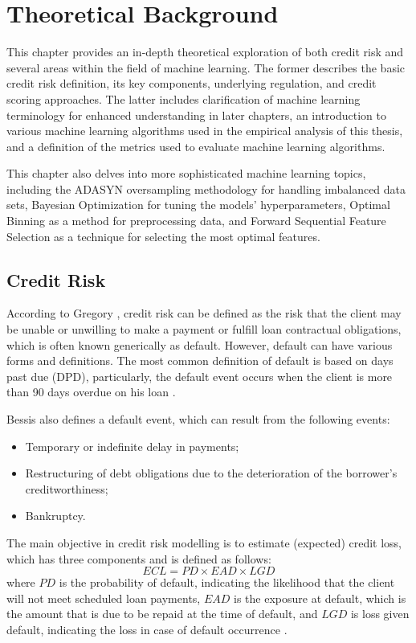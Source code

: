 \chapter{Theoretical Background}
\label{chap:two}
This chapter provides an in-depth theoretical exploration of both credit risk and several areas within the field of machine learning. The former describes the basic credit risk definition, its key components, underlying regulation, and credit scoring approaches.
The latter includes clarification of machine learning terminology for enhanced understanding in later chapters, an introduction to various machine learning algorithms used in the empirical analysis of this thesis, and a definition of the metrics used to evaluate machine learning algorithms.


This chapter also delves into more sophisticated machine learning topics, including the ADASYN oversampling methodology for handling imbalanced data sets, Bayesian Optimization for tuning the models' hyperparameters, Optimal Binning as a method for preprocessing data, and Forward Sequential Feature Selection as a technique for selecting the most optimal features.


\section{Credit Risk}
\label{sec:creditrisk}


According to Gregory \citep{gregory2012counterparty}, credit risk can be defined as the risk that the client may be unable or unwilling to make a payment or fulfill loan contractual obligations, which is often known generically as default.
However, default can have various forms and definitions.
The most common definition of default is based on days past due (DPD), particularly, the default event occurs when the client is more than 90 days overdue on his loan \citep{brezigar2021modeling}.


Bessis \citep{bessis2015} also defines a default event, which can result from the following events:
\begin{itemize}\setlength\itemsep{0em}
     \item Temporary or indefinite delay in payments;
     \item Restructuring of debt obligations due to the deterioration of the borrower's creditworthiness;
      \item Bankruptcy.
\end{itemize}
The main objective in credit risk modelling is to estimate (expected) credit loss, which has three components and is defined as follows:
\begin{equation}
     ECL = PD \times EAD \times LGD
\end{equation}
where $PD$ is the probability of default, indicating the likelihood that the client will not meet scheduled loan payments, $EAD$ is the exposure at default, which is the amount that is due to be repaid at the time of default, and $LGD$ is loss given default, indicating the loss in case of default occurrence \citep{doumpos2019analytical}.


